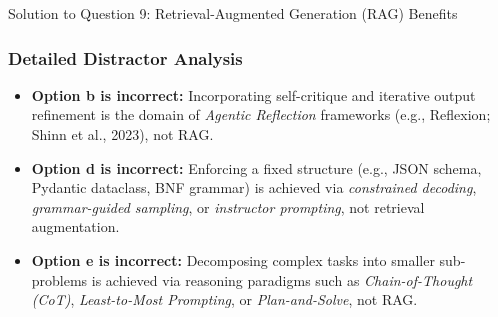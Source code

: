 \documentclass[11pt,a4paper]{article}
\begin{document}
\begin{solutionbox}{Solution to Question 9: Retrieval-Augmented Generation (RAG) Benefits}
\subsubsection*{Detailed Distractor Analysis}
\begin{itemize}[leftmargin=1.5em]
    \item \textbf{Option b is incorrect:} Incorporating self-critique and iterative output refinement is the domain of \textit{Agentic Reflection} frameworks (e.g., Reflexion; Shinn et al., 2023), not RAG.
    \item \textbf{Option d is incorrect:} Enforcing a fixed structure (e.g., JSON schema, Pydantic dataclass, BNF grammar) is achieved via \textit{constrained decoding}, \textit{grammar-guided sampling}, or \textit{instructor prompting}, not retrieval augmentation.
    \item \textbf{Option e is incorrect:} Decomposing complex tasks into smaller sub-problems is achieved via reasoning paradigms such as \textit{Chain-of-Thought (CoT)}, \textit{Least-to-Most Prompting}, or \textit{Plan-and-Solve}, not RAG.
\end{itemize}
\end{solutionbox}

\vspace{0.4cm}
\end{document}
